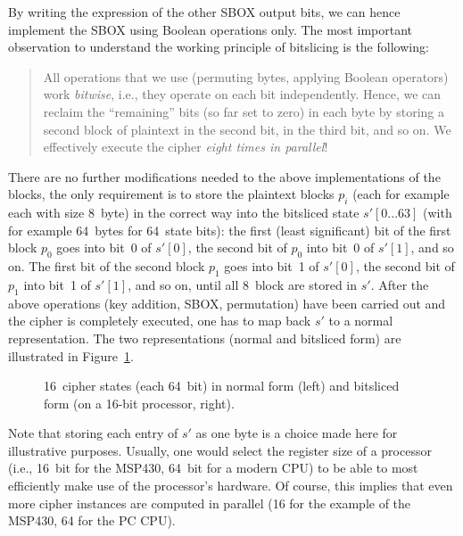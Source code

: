 By writing the expression of the other \ac{SBOX} output bits, we can hence implement the \ac{SBOX} using Boolean operations only.
The most important observation to understand the working principle of bitslicing is the following:

\begin{quote}
All operations that we use (permuting bytes, applying Boolean operators) work \emph{bitwise}, i.e., they operate on each bit independently. Hence, we can reclaim the ``remaining'' bits (so far set to zero) in each byte by storing a second block of plaintext in the second bit, in the third bit, and so on. We effectively execute the cipher \emph{eight times in parallel}!
\end{quote}

There are no further modifications needed to the above implementations of the blocks, the only requirement is to store the plaintext blocks $p_i$ (each for example each with size 8~byte) in the correct way into the bitsliced state $s'\left[0 ... 63\right]$ (with for example 64~bytes for 64~state bits): the first (least significant) bit of the first block $p_0$ goes into bit~0 of $s'\left[0\right]$, the second bit of $p_0$ into bit~0 of $s'\left[1\right]$, and so on. The first bit of the second block $p_1$ goes into bit~1 of $s'\left[0\right]$, the second bit of $p_1$ into bit~1 of $s'\left[1\right]$, and so on, until all 8~block are stored in $s'$. After the above operations (key addition, \ac{SBOX}, permutation) have been carried out and the cipher is completely executed, one has to map back $s'$ to a normal representation. The two representations (normal and bitsliced form) are illustrated in Figure~\ref{fig:symmetric_crypto:bitslicing}.

\begin{figure}[h!tb]
		\center
		
		\caption{16~cipher states (each 64~bit) in normal form (left) and bitsliced form (on a 16-bit processor, right).}
		\label{fig:symmetric_crypto:bitslicing}
\end{figure} 

Note that storing each entry of $s'$ as one byte is a choice made here for illustrative purposes. Usually, one would select the register size of a processor (i.e., 16~bit for the MSP430, 64~bit for a modern \ac{CPU}) to be able to most efficiently make use of the processor's hardware. Of course, this implies that even more cipher instances are computed in parallel (16 for the example of the MSP430, 64 for the \ac{PC} \ac{CPU}).

